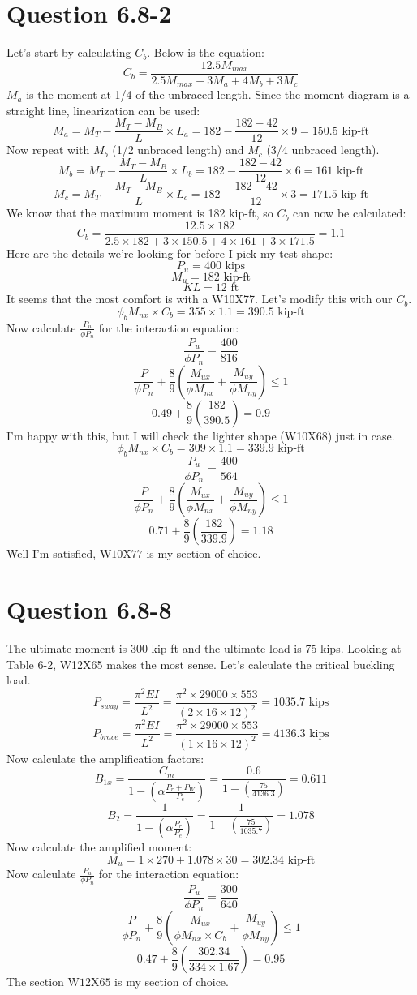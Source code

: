 \documentclass{article}
\begin{document}
\section*{Question 6.8-2}
Let's start by calculating $C_b$. Below is the equation: 
\[C_b=\frac{12.5M_{max}}{2.5M_{max}+3M_a+4M_b+3M_c}\]
$M_a$ is the moment at 1/4 of the unbraced length. Since the moment diagram is a straight line, linearization can be used:
\[M_a=M_T-\frac{M_T-M_B}{L}\times L_a=182-\frac{182-42}{12}\times 9=150.5\text{ kip-ft}\] 
Now repeat with $M_b$ (1/2 unbraced length) and $M_c$ (3/4 unbraced length). 
\[M_b=M_T-\frac{M_T-M_B}{L}\times L_b=182-\frac{182-42}{12}\times 6=161\text{ kip-ft}\] 
\[M_c=M_T-\frac{M_T-M_B}{L}\times L_c=182-\frac{182-42}{12}\times 3=171.5\text{ kip-ft}\] 
We know that the maximum moment is 182 kip-ft, so $C_b$ can now be calculated: 
\[C_b=\frac{12.5\times 182}{2.5\times 182+3\times 150.5+4\times 161+3\times 171.5}=1.1\]
Here are the details we're looking for before I pick my test shape: 
\[P_u=400 \text{ kips}\] 
\[M_u=182\text{ kip-ft}\]
\[KL=12\text{ ft}\]
It seems that the most comfort is with a W10X77. Let's modify this with our $C_b$.
\[\phi_b M_{nx}\times C_b=355\times 1.1=390.5\text{ kip-ft}\]
Now calculate $\frac{P_u}{\phi P_n}$ for the interaction equation: 
\[\frac{P_u}{\phi P_n}=\frac{400}{816}\]
\[\frac{P}{\phi P_n}+\frac{8}{9}\left(\frac{M_{ux}}{\phi M_{nx}}+\frac{M_{uy}}{\phi M_{ny}}\right) \leq 1\]
\[0.49+\frac{8}{9}\left(\frac{182}{390.5}\right)=0.9\]
I'm happy with this, but I will check the lighter shape (W10X68) just in case.
\[\phi_b M_{nx}\times C_b=309\times 1.1=339.9\text{ kip-ft}\]
\[\frac{P_u}{\phi P_n}=\frac{400}{564}\]
\[\frac{P}{\phi P_n}+\frac{8}{9}\left(\frac{M_{ux}}{\phi M_{nx}}+\frac{M_{uy}}{\phi M_{ny}}\right) \leq 1\]
\[0.71+\frac{8}{9}\left(\frac{182}{339.9}\right)=1.18\]
Well I'm satisfied, $\boxed{\text{W10X77}}$ is my section of choice.
\section*{Question 6.8-8}
The ultimate moment is 300 kip-ft and the ultimate load is 75 kips. Looking at Table 6-2, W12X65 makes the most sense. Let's calculate the critical buckling load. 
\[P_{sway}=\frac{\pi^2EI}{L^2}=\frac{\pi^2\times 29000\times 553}{(2\times 16\times 12)^2}=1035.7\text{ kips}\]
\[P_{brace}=\frac{\pi^2EI}{L^2}=\frac{\pi^2\times 29000\times 553}{(1\times 16\times 12)^2}=4136.3\text{ kips}\]
Now calculate the amplification factors: 
\[B_{1x}=\frac{C_m}{1-\left(\alpha\frac{P_r+P_W}{P_e}\right)}=\frac{0.6}{1-\left(\frac{75}{4136.3}\right)}=0.611\] 
\[B_2=\frac{1}{1-\left(\alpha\frac{P_r}{P_e}\right)}=\frac{1}{1-\left(\frac{75}{1035.7}\right)}=1.078\]
Now calculate the amplified moment:
\[M_u=1\times 270 + 1.078\times 30 = 302.34\text{ kip-ft}\] 
Now calculate $\frac{P_u}{\phi P_n}$ for the interaction equation: 
\[\frac{P_u}{\phi P_n}=\frac{300}{640}\]
\[\frac{P}{\phi P_n}+\frac{8}{9}\left(\frac{M_{ux}}{\phi M_{nx}\times C_b}+\frac{M_{uy}}{\phi M_{ny}}\right) \leq 1\]
\[0.47+\frac{8}{9}\left(\frac{302.34}{334\times 1.67}\right)=0.95\]
The section $\boxed{\text{W12X65}}$ is my section of choice.
\end{document}
